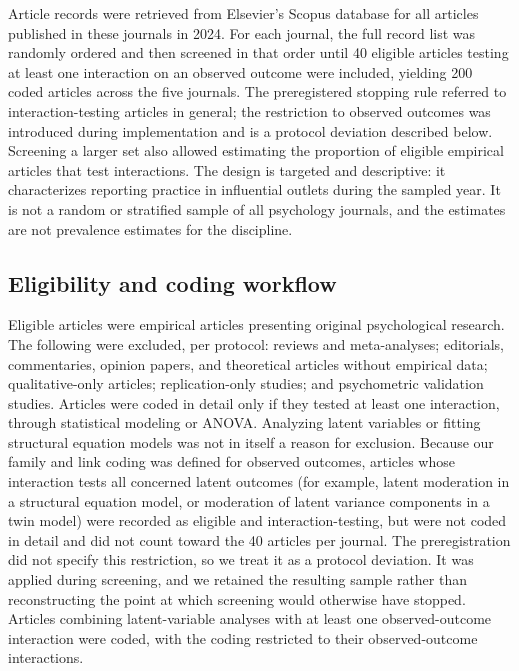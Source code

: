 \documentclass[
  man,
  floatsintext,
  longtable,
  nolmodern,
  notxfonts,
  notimes,
  colorlinks=true,linkcolor=blue,citecolor=blue,urlcolor=blue]{apa7}
\begin{document}
Article records were retrieved from Elsevier's Scopus database for all
articles published in these journals in 2024. For each journal, the full
record list was randomly ordered and then screened in that order until
40 eligible articles testing at least one interaction on an observed
outcome were included, yielding 200 coded articles across the five
journals. The preregistered stopping rule referred to
interaction-testing articles in general; the restriction to observed
outcomes was introduced during implementation and is a protocol
deviation described below. Screening a larger set also allowed
estimating the proportion of eligible empirical articles that test
interactions. The design is targeted and descriptive: it characterizes
reporting practice in influential outlets during the sampled year. It is
not a random or stratified sample of all psychology journals, and the
estimates are not prevalence estimates for the discipline.

\subsection{Eligibility and coding
workflow}\label{eligibility-and-coding-workflow}

Eligible articles were empirical articles presenting original
psychological research. The following were excluded, per protocol:
reviews and meta-analyses; editorials, commentaries, opinion papers, and
theoretical articles without empirical data; qualitative-only articles;
replication-only studies; and psychometric validation studies. Articles
were coded in detail only if they tested at least one interaction,
through statistical modeling or ANOVA. Analyzing latent variables or
fitting structural equation models was not in itself a reason for
exclusion. Because our family and link coding was defined for observed
outcomes, articles whose interaction tests all concerned latent outcomes
(for example, latent moderation in a structural equation model, or
moderation of latent variance components in a twin model) were recorded
as eligible and interaction-testing, but were not coded in detail and
did not count toward the 40 articles per journal. The preregistration
did not specify this restriction, so we treat it as a protocol
deviation. It was applied during screening, and we retained the
resulting sample rather than reconstructing the point at which screening
would otherwise have stopped. Articles combining latent-variable
analyses with at least one observed-outcome interaction were coded, with
the coding restricted to their observed-outcome interactions.
\end{document}
